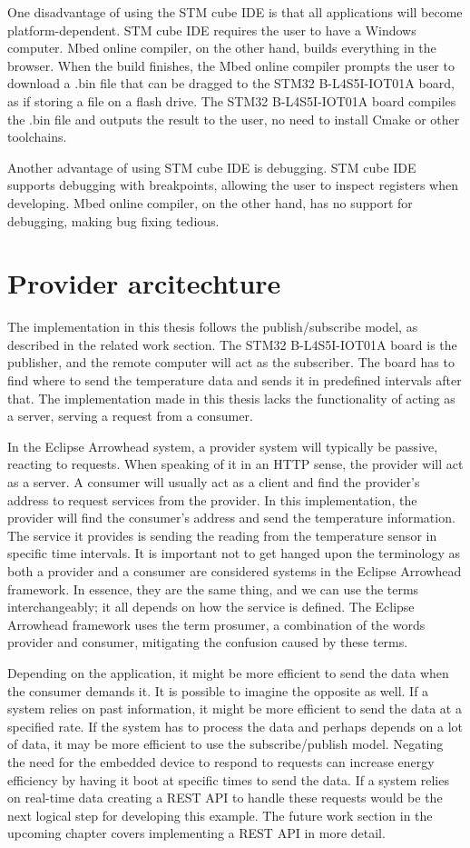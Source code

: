 One disadvantage of using the STM cube IDE is that all applications will become platform-dependent.
STM cube IDE requires the user to have a Windows computer. 
Mbed online compiler, on the other hand, builds everything in the browser.
When the build finishes, the Mbed online compiler prompts the user to download a .bin file that can be dragged to the STM32 B-L4S5I-IOT01A board, as if storing a file on a flash drive.
The STM32 B-L4S5I-IOT01A board compiles the .bin file and outputs the result to the user, no need to install Cmake or other toolchains. 

Another advantage of using STM cube IDE is debugging. 
STM cube IDE supports debugging with breakpoints, allowing the user to inspect registers when developing.
Mbed online compiler, on the other hand, has no support for debugging, making bug fixing tedious.

\section{Provider arcitechture}
The implementation in this thesis follows the publish/subscribe model, as described in the related work section. 
The STM32 B-L4S5I-IOT01A board is the publisher, and the remote computer will act as the subscriber.
The board has to find where to send the temperature data and sends it in predefined intervals after that. 
The implementation made in this thesis lacks the functionality of acting as a server, serving a request from a consumer.


In the Eclipse Arrowhead system, a provider system will typically be passive, reacting to requests.
When speaking of it in an HTTP sense, the provider will act as a server.
A consumer will usually act as a client and find the provider's address to request services from the provider. 
In this implementation, the provider will find the consumer's address and send the temperature information.
The service it provides is sending the reading from the temperature sensor in specific time intervals. 
It is important not to get hanged upon the terminology as both a provider and a consumer are considered systems in the Eclipse Arrowhead framework. 
In essence, they are the same thing, and we can use the terms interchangeably; it all depends on how the service is defined.
The Eclipse Arrowhead framework uses the term prosumer, a combination of the words provider and consumer, mitigating the confusion caused by these terms.

Depending on the application, it might be more efficient to send the data when the consumer demands it. 
It is possible to imagine the opposite as well.
If a system relies on past information, it might be more efficient to send the data at a specified rate.
If the system has to process the data and perhaps depends on a lot of data, it may be more efficient to use the subscribe/publish model. 
Negating the need for the embedded device to respond to requests can increase energy efficiency by having it boot at specific times to send the data.
If a system relies on real-time data creating a REST API to handle these requests would be the next logical step for developing this example.
The future work section in the upcoming chapter covers implementing a REST API in more detail. 

